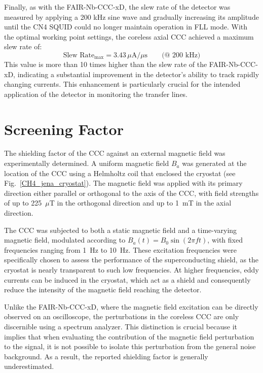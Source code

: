 \documentclass[12pt,a4paper]{report}
\begin{document}
        Finally, as with the FAIR-Nb-CCC-xD, the slew rate of the detector was measured by applying a 200 kHz sine wave and gradually increasing its amplitude until the CN4 SQUID could no longer maintain operation in FLL mode. With the optimal working point settings, the coreless axial CCC achieved a maximum slew rate of:
        \begin{equation}
        	\text{Slew Rate}_{\text{max}} = 3.43\,\mu\text{A}/\mu\text{s} \qquad \text{(@ 200 kHz)}
        \end{equation}
        This value is more than 10 times higher than the slew rate of the FAIR-Nb-CCC-xD, indicating a substantial improvement in the detector's ability to track rapidly changing currents. This enhancement is particularly crucial for the intended application of the detector in monitoring the transfer lines.
        
        
        
        \section{Screening Factor}
        The shielding factor of the CCC against an external magnetic field was experimentally determined. A uniform magnetic field $B_a$ was generated at the location of the CCC using a Helmholtz coil that enclosed the cryostat (see Fig.~\ref{CH4_jena_cryostat}). The magnetic field was applied with its primary direction either parallel or orthogonal to the axis of the CCC, with field strengths of up to 225~$\mu$T in the orthogonal direction and up to 1~mT in the axial direction. 
        
        The CCC was subjected to both a static magnetic field and a time-varying magnetic field, modulated according to $B_a(t) = B_0\sin(2\pi f t)$, with fixed frequencies ranging from 1~Hz to 10~Hz. These excitation frequencies were specifically chosen to assess the performance of the superconducting shield, as the cryostat is nearly transparent to such low frequencies. At higher frequencies, eddy currents can be induced in the cryostat, which act as a shield and consequently reduce the intensity of the magnetic field reaching the detector.
        
        Unlike the FAIR-Nb-CCC-xD, where the magnetic field excitation can be directly observed on an oscilloscope, the perturbations in the coreless CCC are only discernible using a spectrum analyzer. This distinction is crucial because it implies that when evaluating the contribution of the magnetic field perturbation to the signal, it is not possible to isolate this perturbation from the general noise background. As a result, the reported shielding factor is generally underestimated.
        
\end{document}
